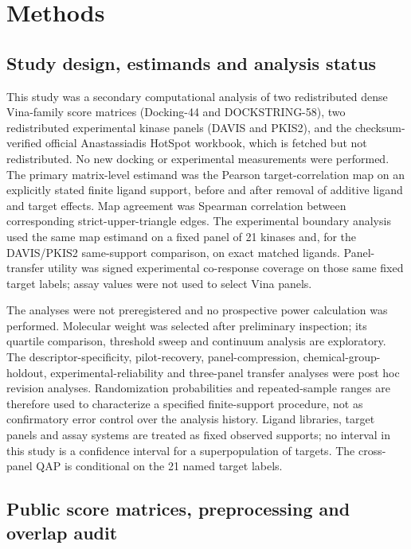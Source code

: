 \section{Methods}

\subsection{Study design, estimands and analysis status}

This study was a secondary computational analysis of two redistributed dense
Vina-family score matrices (Docking-44 and DOCKSTRING-58), two redistributed
experimental kinase panels (DAVIS and PKIS2), and the checksum-verified official
Anastassiadis HotSpot workbook, which is fetched but not redistributed. No new
docking or experimental measurements were performed. The primary matrix-level estimand
was the Pearson target-correlation map on an explicitly stated finite ligand
support, before and after removal of additive ligand and target effects.  Map
agreement was Spearman correlation between corresponding strict-upper-triangle
edges.  The experimental boundary analysis used the same map estimand on a
fixed panel of 21 kinases and, for the DAVIS/PKIS2 same-support comparison, on
exact matched ligands. Panel-transfer utility was signed experimental
co-response coverage on those same fixed target labels; assay values were not
used to select Vina panels.

The analyses were not preregistered and no prospective power calculation was
performed.  Molecular weight was selected after preliminary inspection; its
quartile comparison, threshold sweep and continuum analysis are exploratory.
The descriptor-specificity, pilot-recovery, panel-compression,
chemical-group-holdout, experimental-reliability and three-panel transfer
analyses were post hoc revision analyses. Randomization probabilities and repeated-sample ranges are
therefore used to characterize a specified finite-support procedure, not as
confirmatory error control over the analysis history.  Ligand libraries, target
panels and assay systems are treated as fixed observed supports; no interval in
this study is a confidence interval for a superpopulation of targets.  The
cross-panel QAP is conditional on the 21 named target labels.

\subsection{Public score matrices, preprocessing and overlap audit}

